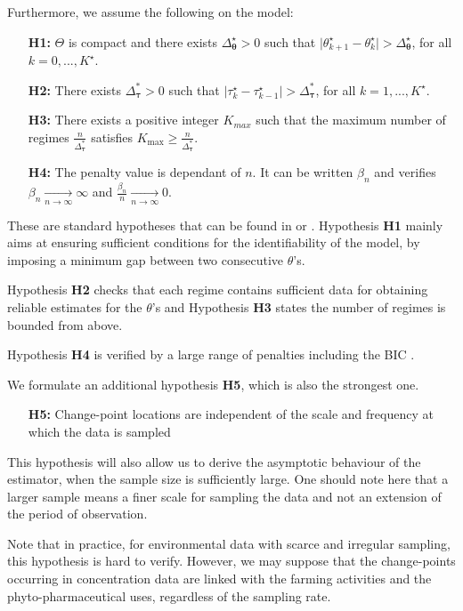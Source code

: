 Furthermore, we assume the following on the model:  
\begin{itemize}
\item[\textbf{H1:}] $\Theta$ is compact and there exists $\Delta_{\bm \theta}^{\star}>0$ such that $\vert \theta_{k+1}^{\star}-\theta_{k}^{\star}\vert > \Delta_{\bm \theta}^{\star}$, for all $k=0,...,K^{\star}$.
\item[\textbf{H2:}] There exists $\Delta_{\bm \tau}^*>0$ such that $\vert \tau_{k}^{\star}-\tau_{k-1}^{\star}\vert > \Delta^*_{\bm \tau}$, for all $k=1,...,K^{\star}$.
\item[\textbf{H3:}]  There exists a positive integer $K_{max}$ such that the maximum number of regimes $\frac{n}{\Delta^*_{\bm \tau}}$ satisfies $K_{\max} \geq \frac{n}{\Delta^*_{\bm \tau}}$. 
\item[\textbf{H4:}] The penalty value is dependant of $n$. It can be written $\beta_{n}$ and verifies $\beta_{n}\xrightarrow[n\rightarrow \infty]{} \infty$ and $\frac{\beta_{n}}{n}\xrightarrow[n\rightarrow \infty]{} 0$.
\end{itemize}

These are standard hypotheses that can be found in \cite{Lavielle1997} or \cite{He2010}. Hypothesis \textbf{H1} mainly aims at ensuring sufficient conditions for the identifiability of the model, by imposing a minimum gap between two consecutive $\theta$'s. 

Hypothesis \textbf{H2} checks that each regime contains sufficient data for obtaining reliable estimates for the $\theta$'s and Hypothesis \textbf{H3} states the number of regimes is bounded from above.  

Hypothesis \textbf{H4} is verified by a large range of penalties including the BIC \citep{YAO1988181}. 

We formulate an additional hypothesis \textbf{H5}, which is also the strongest one. 
\begin{itemize}
\item[\textbf{H5:}] Change-point locations are independent of the scale and frequency at which the data is sampled
\end{itemize}
This hypothesis will also allow us to derive the asymptotic behaviour of the estimator, when the sample size is sufficiently large. One should note here that a larger sample means a finer scale for sampling the data and not an extension of the period of observation. 

Note that in practice, for environmental data with scarce and irregular sampling, this hypothesis is hard to verify.
However, we may suppose that the change-points occurring in concentration data are linked with the farming activities and the phyto-pharmaceutical uses, regardless of the sampling rate. 


